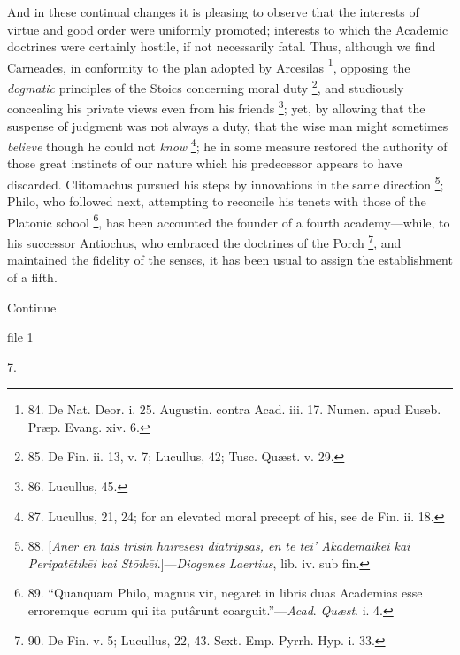And in these continual changes
it is pleasing to observe that the interests of virtue and good order
were uniformly promoted; interests to which the Academic
doctrines were certainly hostile, if not necessarily fatal. Thus,
although we find Carneades, in conformity to the plan adopted by
Arcesilas \footnote{84. De Nat. Deor. i. 25.
Augustin. contra Acad. iii. 17. Numen. apud Euseb. Præp. Evang. xiv.
6.}, opposing
the \emph{dogmatic} principles of the Stoics concerning moral duty \footnote{85. De Fin. ii. 13, v. 7;
Lucullus, 42; Tusc. Quæst. v. 29.}, and studiously concealing his private views even from his
friends \footnote{86.
Lucullus, 45.}; yet, by
allowing that the suspense of judgment was not always a duty, that the
wise man might sometimes \emph{believe} though he could not \emph{know}
\footnote{87. Lucullus,
21, 24; for an
elevated moral precept of his, see de Fin. ii. 18.}; he in some measure
restored the authority of those great instincts of our nature which
his predecessor appears to have discarded. Clitomachus pursued his
steps by innovations in the same direction \footnote{88. [\emph{An\={e}r en tais
trisin hairesesi diatripsas, en te t\={e}i' Akad\={e}maik\={e}i
kai Peripat\={e}tik\={e}i kai St\={o}ik\={e}i}.]—\emph{Diogenes
Laertius}, lib. iv. sub fin.}; Philo, who followed next, attempting to reconcile his tenets
with those of the Platonic school \footnote{89. ``Quanquam Philo, magnus
vir, negaret in libris duas Academias esse erroremque eorum qui ita
putârunt coarguit.''—\emph{Acad}. \emph{Quæst}. i. 4.}, has been accounted the founder of a fourth academy—while,
to his successor Antiochus, who embraced the doctrines of the Porch \footnote{90. De Fin. v. 5; Lucullus,
22, 43. Sext. Emp. Pyrrh. Hyp. i. 33.}, and maintained the fidelity of the senses, it has been usual
to assign the establishment of a fifth.

Continue


file 1

7.

